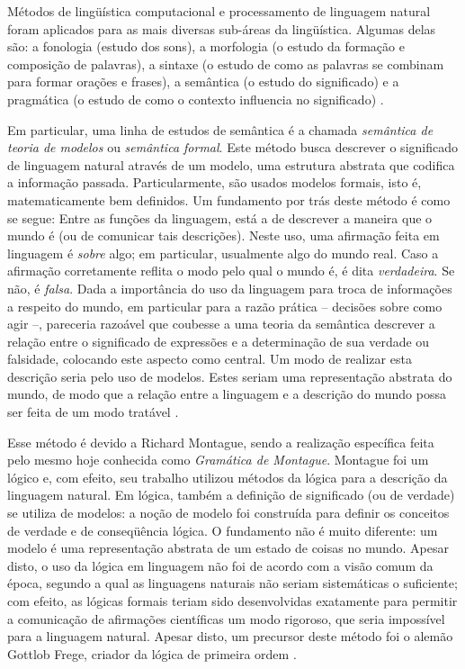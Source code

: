 	Métodos de lingüística computacional e processamento de linguagem natural foram aplicados para as mais diversas sub-áreas da lingüística. Algumas delas são: a fonologia (estudo dos sons), a morfologia (o estudo da formação e composição de palavras), a sintaxe (o estudo de como as palavras se combinam para formar orações e frases), a semântica (o estudo do significado) e a pragmática (o estudo de como o contexto influencia no significado) \citep[p.~2]{vanEijck:2010}.
	
	Em particular, uma linha de estudos de semântica é a chamada \textit{semântica de teoria de modelos} ou \textit{semântica formal}. Este método busca descrever o significado de linguagem natural através de um modelo, uma estrutura abstrata que codifica a informação passada. Particularmente, são usados modelos formais, isto é, matematicamente bem definidos. Um fundamento por trás deste método é como se segue:
		Entre as funções da linguagem, está a de descrever a maneira que o mundo é (ou de comunicar tais descrições). Neste uso, uma afirmação feita em linguagem é \textit{sobre} algo; em particular, usualmente algo do mundo real. Caso a afirmação corretamente reflita o modo pelo qual o mundo é, é dita \textit{verdadeira}. Se não, é \textit{falsa}. Dada a importância do uso da linguagem para troca de informações a respeito do mundo, em particular para a razão prática -- decisões sobre como agir --, pareceria razoável que coubesse a uma teoria da semântica descrever a relação entre o significado de expressões e a determinação de sua verdade ou falsidade, colocando este aspecto como central.
%		
		Um modo de realizar esta descrição seria pelo uso de modelos. Estes seriam uma representação abstrata do mundo, de modo que a relação entre a linguagem e a descrição do mundo possa ser feita de um modo tratável \citep[pp.~11--13]{Kamp:1993}.
	
	Esse método é devido a Richard Montague, sendo a realização específica feita pelo mesmo hoje conhecida como \textit{Gramática de Montague}. 
	Montague foi um lógico e, com efeito, seu trabalho utilizou métodos da lógica para a descrição da linguagem natural. Em lógica, também a definição de significado (ou de verdade) se utiliza de modelos: a noção de modelo foi construída para definir os conceitos de verdade e de conseqüência lógica. O fundamento não é muito diferente: um modelo é uma representação abstrata de um estado de coisas no mundo. Apesar disto, o uso da lógica em linguagem não foi de acordo com a visão comum da época, segundo a qual as linguagens naturais não seriam sistemáticas o suficiente; com efeito, as lógicas formais teriam sido desenvolvidas exatamente para permitir a comunicação de afirmações científicas um modo rigoroso, que seria impossível para a linguagem natural. Apesar disto, um precursor deste método foi o alemão Gottlob Frege, criador da lógica de primeira ordem \citep[pp.~12,16--17,21--23]{Kamp:1993}.

